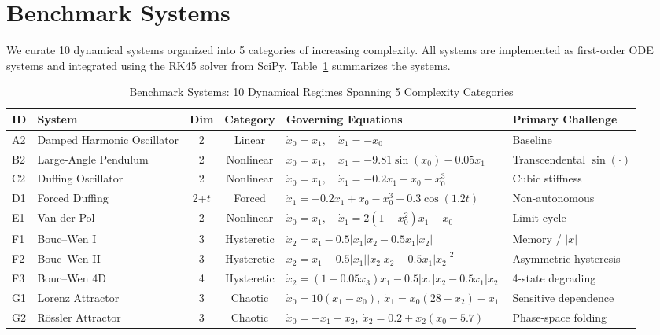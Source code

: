 \section{Benchmark Systems}
\label{sec:systems}

We curate 10 dynamical systems organized into 5 categories of increasing complexity. All systems are implemented as first-order ODE systems and integrated using the RK45 solver from SciPy. Table~\ref{tab:systems} summarizes the systems.

\begin{table}[!ht]
\centering
\caption{Benchmark Systems: 10 Dynamical Regimes Spanning 5 Complexity Categories}
\label{tab:systems}
\begin{tabular}{@{}llccll@{}}
\toprule
\textbf{ID} & \textbf{System} & \textbf{Dim} & \textbf{Category} & \textbf{Governing Equations} & \textbf{Primary Challenge} \\
\midrule
A2 & Damped Harmonic Oscillator & 2 & Linear &
$\dot{x}_0 = x_1,\quad \dot{x}_1 = -x_0$ & Baseline \\
\midrule
B2 & Large-Angle Pendulum & 2 & Nonlinear &
$\dot{x}_0 = x_1,\quad \dot{x}_1 = -9.81\sin(x_0) - 0.05 x_1$ & Transcendental $\sin(\cdot)$ \\
\midrule
C2 & Duffing Oscillator & 2 & Nonlinear &
$\dot{x}_0 = x_1,\quad \dot{x}_1 = -0.2 x_1 + x_0 - x_0^3$ & Cubic stiffness \\
\midrule
D1 & Forced Duffing & 2+$t$ & Forced &
$\dot{x}_1 = -0.2 x_1 + x_0 - x_0^3 + 0.3\cos(1.2t)$ & Non-autonomous \\
\midrule
E1 & Van der Pol & 2 & Nonlinear &
$\dot{x}_0 = x_1,\quad \dot{x}_1 = 2(1 - x_0^2)x_1 - x_0$ & Limit cycle \\
\midrule
F1 & Bouc--Wen I & 3 & Hysteretic &
$\dot{x}_2 = x_1 - 0.5|x_1|x_2 - 0.5 x_1|x_2|$ & Memory / $|x|$ \\
\midrule
F2 & Bouc--Wen II & 3 & Hysteretic &
$\dot{x}_2 = x_1 - 0.5|x_1||x_2|x_2 - 0.5 x_1|x_2|^2$ & Asymmetric hysteresis \\
\midrule
F3 & Bouc--Wen 4D & 4 & Hysteretic &
$\dot{x}_2 = (1 - 0.05 x_3)x_1 - 0.5|x_1|x_2 - 0.5 x_1|x_2|$ & 4-state degrading \\
\midrule
G1 & Lorenz Attractor & 3 & Chaotic &
$\dot{x}_0 = 10(x_1 - x_0),\ \dot{x}_1 = x_0(28 - x_2) - x_1$ & Sensitive dependence \\
\midrule
G2 & R\"{o}ssler Attractor & 3 & Chaotic &
$\dot{x}_0 = -x_1 - x_2,\ \dot{x}_2 = 0.2 + x_2(x_0 - 5.7)$ & Phase-space folding \\
\bottomrule
\end{tabular}
\end{table}

